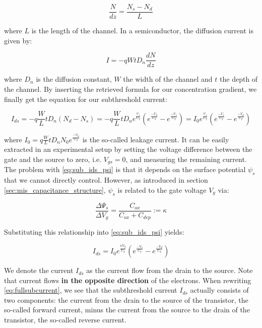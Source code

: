 \begin{equation}
    \frac{N}{dz} = \frac{N_s - N_d}{L}
\end{equation}

where $L$ is the length of the channel. In a semiconductor, the diffusion current is given by:

\begin{equation}
    I = -q W t D_n \frac{dN}{dz}
\end{equation}

where $D_n$ is the diffusion constant, $W$ the width of the channel and $t$ the depth of the channel. By inserting the retrieved formula for our concentration gradient, we finally get the equation for our subthreshold current:

\begin{equation}
    I_{ds} = -q \frac{W}{L} t D_n (N_d - N_s) = -q \frac{W}{L} t D_n e^{\frac{\psi_s}{U_T}} (e^{\frac{-V_d}{U_T}} - e^{\frac{-V_s}{U_T}}) = I_0 e^{\frac{\psi_s}{U_T}} (e^{\frac{-V_s}{U_T}} - e^{\frac{-V_d}{U_T}})\label{eq:sub_ids_psi}
\end{equation}

where $I_0 = q \frac{W}{L} t D_n N_0 e^{\frac{-\psi_0}{U_T}}$ is the so-called leakage current. It can be easily extracted in an experimental setup by setting the voltage difference between the gate and the source to zero, i.e. $V_{gs} = 0$, and measuring the remaining current. The problem with \eqref{eq:sub_ids_psi} is that it depends on the surface potential $\psi_s$ that we cannot directly control. However, as introduced in section \ref{sec:mis_capacitance_structure}, $\psi_s$ is related to the gate voltage $V_g$ via:

\begin{equation}
\frac{\Delta \Psi_s}{\Delta V_g} = \frac{C_{ox}}{C_{ox} + C_{dep}} := \kappa
\end{equation}

Substituting this relationship into \eqref{eq:sub_ids_psi} yields:

\begin{equation}
    I_{ds} = I_0 e^{\frac{\kappa V_g}{U_T}}(e^{\frac{-V_s}{U_T}} - e^{\frac{-V_d}{U_T}}) \label{eq:fullsubcurrent}
\end{equation}

We denote the current $I_{ds}$ as the current flow from the drain to the source. Note that current flows \textbf{in the opposite direction} of the electrons. When rewriting \eqref{eq:fullsubcurrent}, we see that the subthreshold current $I_{ds}$ actually consists of two components: the current from the drain to the source of the transistor, the so-called forward current, minus the current from the source to the drain of the transistor, the so-called reverse current.

